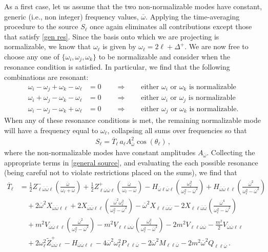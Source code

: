 \documentclass[letterpaper,11pt]{article}
\newcommand{\oi}{\omega_i}
\newcommand{\oj}{\omega_j}
\newcommand{\ok}{\omega_k}
\newcommand{\ol}{\omega_\ell}
\newcommand{\thl}{\theta_\ell}
\newcommand{\ob}{\overline{\omega}}
\begin{document}
As a first case, let us assume that the two non-normalizable modes have constant, generic (i.e., non integer) frequency values, $\ob$. Applying the time-averaging procedure to the source $S_\ell$ once again eliminates all contributions except those that satisfy \eqref{gen res}. Since the basis onto which we are projecting is normalizable, we know that $\omega_\ell$ is given by $\omega_\ell = 2\ell + \Delta^{+}$. We are now free to choose any one of $\{\omega_i, \omega_j, \ok\}$ to be normalizable and consider when the resonance condition is satisfied. In particular, we find that the following combinations are resonant:
\begin{align}
\label{gen nn res 1}
\oi - \oj + \ok - \ol &= 0 \qquad \Rightarrow \qquad \text{either $\oi$ or $\ok$ is normalizable} \\
\oi + \oj - \ok - \ol &= 0 \qquad \Rightarrow \qquad \text{either $\oi$ or $\oj$ is normalizable} \\
\oi - \oj - \ok + \ol &= 0 \qquad \Rightarrow \qquad \text{either $\oj$ or $\ok$ is normalizable.}
\label{gen nn res 2}
\end{align}
When any of these resonance conditions is met, the remaining normalizable mode will have a frequency equal to $\ol$, collapsing all sums over frequencies so that
\begin{align}
S_\ell = \overline{T}_\ell \, a_\ell A_{\ob}^2 \cos (\thl) \, ,
\end{align}
where the non-normalizable modes have constant amplitudes $A_{\ob}$. Collecting the appropriate terms in \eqref{general source}, and evaluating the each possible resonance (being careful not to violate restrictions placed on the sums), we find that
\begin{align}
\overline{T}_\ell &= \frac{1}{2} Z^{-}_{\ell \ob \ob \ell} \left( \frac{\ob}{\ol + \ob} \right) + \frac{1}{2} Z^{+}_{\ell \ob \ob \ell} \left( \frac{\ob}{\ol - \ob} \right) - H_{\ob \ell \ob \ell} \left( \frac{\ol^2}{\ol^2 - \ob^2} \right) + H_{\ob \ob \ell \ell} \left( \frac{\ob^2}{\ol^2 - \ob^2} \right) \nonumber \\
%
& \quad + 2 \ob^2 X_{\ob \ob \ell \ell} + 2 X_{\ob \ob \ell \ell} \left( \frac{{\ob}^2 \ol^2}{\ol^2 - \ob^2} \right) - \ob^2 X_{\ell \ell \ob \ob} - 2 X_{\ell \ell \ob \ob}  \left( \frac{\ob^4}{\ol^2 - \ob^2} \right) \nonumber \\
% 
& \quad + m^2 V_{\ob \ob \ell \ell} \left( \frac{\ob^2}{\ol^2 - \ob^2} \right) - m^2 V_{\ell \ell \ob \ob} \left( \frac{\ol^2}{\ol^2 - \ob^2} \right) - 2m^2 V_{\ell \ell \ob \ob} - \frac{m^2}{2} V_{\ob \ob \ell \ell}  \nonumber \\
%
& \quad + 2 \ol^2 \tilde{Z}^+_{\ob \ob \ell} - H_{\ob \ob \ell \ell} - 4 \ob^2 \ol^2 P_{\ell \ell \ob} -2 \ob^2 M_{\ell \ell \ob} - 2 m^2 \ob^2 Q_{\ell \ell \ob} \, .
\end{align}
\end{document}

